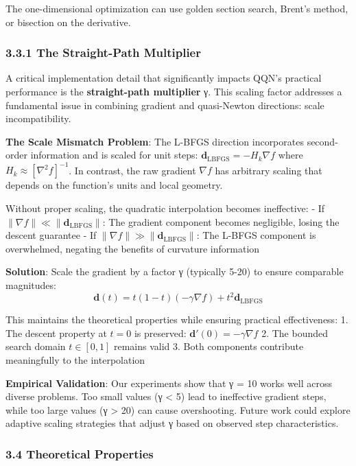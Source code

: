 The one-dimensional optimization can use golden section search, Brent's method, or bisection on the derivative.

\hypertarget{the-straight-path-multiplier}{%
\subsubsection{3.3.1 The Straight-Path Multiplier}\label{the-straight-path-multiplier}}

A critical implementation detail that significantly impacts QQN's practical performance is the \textbf{straight-path multiplier} γ.
This scaling factor addresses a fundamental issue in combining gradient and quasi-Newton directions: scale incompatibility.

\textbf{The Scale Mismatch Problem}: The L-BFGS direction incorporates second-order information and is scaled for unit steps: \(\mathbf{d}_{\text{LBFGS}} = -H_k \nabla f\) where \(H_k \approx [\nabla^2 f]^{-1}\).
In contrast, the raw gradient \(\nabla f\) has arbitrary scaling that depends on the function's units and local geometry.

Without proper scaling, the quadratic interpolation becomes ineffective:
- If \(\|\nabla f\| \ll \|\mathbf{d}_{\text{LBFGS}}\|\): The gradient component becomes negligible, losing the descent guarantee
- If \(\|\nabla f\| \gg \|\mathbf{d}_{\text{LBFGS}}\|\): The L-BFGS component is overwhelmed, negating the benefits of curvature information

\textbf{Solution}: Scale the gradient by a factor γ (typically 5-20) to ensure comparable magnitudes:
\[\mathbf{d}(t) = t(1-t)(-\gamma \nabla f) + t^2 \mathbf{d}_{\text{LBFGS}}\]

This maintains the theoretical properties while ensuring practical effectiveness:
1. The descent property at \(t=0\) is preserved: \(\mathbf{d}'(0) = -\gamma \nabla f\)
2. The bounded search domain \(t \in [0,1]\) remains valid
3. Both components contribute meaningfully to the interpolation

\textbf{Empirical Validation}: Our experiments show that γ = 10 works well across diverse problems. Too small values (γ \textless{} 5) lead to ineffective gradient steps, while too large values (γ \textgreater{} 20) can cause overshooting. Future work could explore adaptive scaling strategies that adjust γ based on observed step characteristics.

\hypertarget{theoretical-properties}{%
\subsubsection{3.4 Theoretical Properties}\label{theoretical-properties}}

